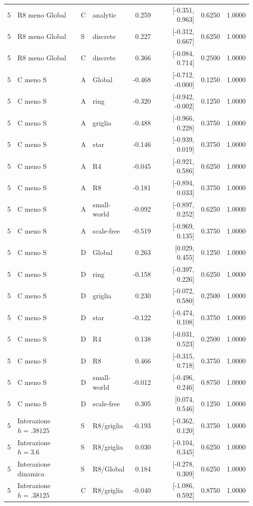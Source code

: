 \begin{longtable}{@{}rlllrrrr@{}}
5 & R8 meno Global & C & analytic & 0.259 & [-0.351, 0.963] & 0.6250 & 1.0000\\
5 & R8 meno Global & S & discrete & 0.227 & [-0.312, 0.667] & 0.6250 & 1.0000\\
5 & R8 meno Global & C & discrete & 0.366 & [-0.084, 0.714] & 0.2500 & 1.0000\\
5 & C meno S & A & Global & -0.468 & [-0.712, -0.000] & 0.1250 & 1.0000\\
5 & C meno S & A & ring & -0.320 & [-0.942, -0.002] & 0.1250 & 1.0000\\
5 & C meno S & A & griglia & -0.488 & [-0.966, 0.228] & 0.3750 & 1.0000\\
5 & C meno S & A & star & -0.146 & [-0.939, 0.019] & 0.3750 & 1.0000\\
5 & C meno S & A & R4 & -0.045 & [-0.921, 0.586] & 0.6250 & 1.0000\\
5 & C meno S & A & R8 & -0.181 & [-0.894, 0.033] & 0.3750 & 1.0000\\
5 & C meno S & A & small-world & -0.092 & [-0.897, 0.252] & 0.6250 & 1.0000\\
5 & C meno S & A & scale-free & -0.519 & [-0.969, 0.135] & 0.3750 & 1.0000\\
5 & C meno S & D & Global & 0.263 & [0.029, 0.455] & 0.1250 & 1.0000\\
5 & C meno S & D & ring & -0.158 & [-0.397, 0.226] & 0.6250 & 1.0000\\
5 & C meno S & D & griglia & 0.230 & [-0.072, 0.580] & 0.2500 & 1.0000\\
5 & C meno S & D & star & -0.122 & [-0.474, 0.108] & 0.3750 & 1.0000\\
5 & C meno S & D & R4 & 0.138 & [-0.031, 0.523] & 0.2500 & 1.0000\\
5 & C meno S & D & R8 & 0.466 & [-0.315, 0.718] & 0.3750 & 1.0000\\
5 & C meno S & D & small-world & -0.012 & [-0.496, 0.246] & 0.8750 & 1.0000\\
5 & C meno S & D & scale-free & 0.305 & [0.074, 0.546] & 0.1250 & 1.0000\\
5 & Interazione $h=.38125$ & S & R8/griglia & -0.193 & [-0.362, 0.120] & 0.3750 & 1.0000\\
5 & Interazione $h=3.6$ & S & R8/griglia & 0.030 & [-0.104, 0.345] & 0.6250 & 1.0000\\
5 & Interazione dinamica & S & R8/Global & 0.184 & [-0.278, 0.309] & 0.6250 & 1.0000\\
5 & Interazione $h=.38125$ & C & R8/griglia & -0.040 & [-1.086, 0.592] & 0.8750 & 1.0000\\

\end{longtable}
